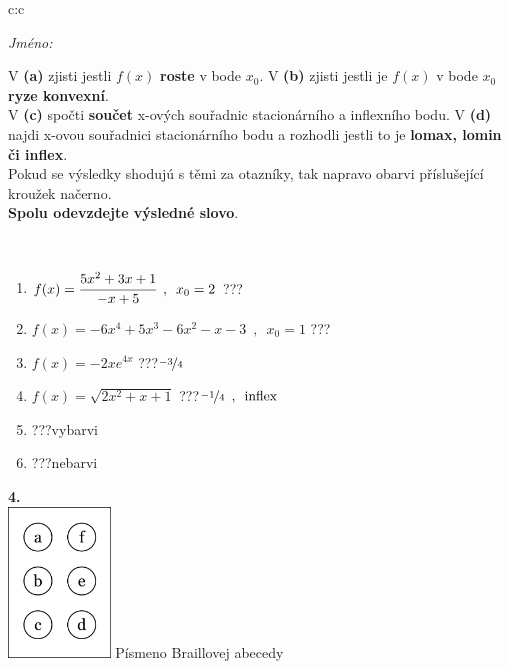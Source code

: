 \documentclass[10pt]{report}
\begin{document}
\begin{tabular}{c:c}
\begin{minipage}[c][104.5mm][t]{0.5\linewidth}
\begin{center}
\textit{Jméno:}\phantom{xxxxxxxxxxxxxxxxxxxxxxxxxxxxxxxxxxxxxxxxxxxxxxxxxxxxxxxxxxxxxxxxx}\\[5mm]
\begin{minipage}{0.95\linewidth}
\begin{center}
{\small V \textbf{(a)} zjisti jestli $f(x)$ \textbf{roste} v bode $x_0$. V \textbf{(b)} zjisti jestli je $f(x)$ v bode $x_0$ \textbf{ryze konvexní}.\\V \textbf{(c)} spočti \textbf{součet} x-ových souřadnic stacionárního a inflexního bodu. V \textbf{(d)} najdi x-ovou souřadnici stacionárního bodu a rozhodli jestli to je \textbf{lomax, lomin či inflex}.\\Pokud se výsledky shodujú s těmi za otazníky, tak napravo obarvi příslušející kroužek načerno.\\\textbf{Spolu odevzdejte výsledné slovo}}.
\end{center}
\end{minipage}
\\[1mm]
\begin{minipage}{0.79\linewidth}
\begin{center}
\begin{varwidth}{\linewidth}
\begin{enumerate}
\normalsize
\item $f(x)=\cfrac{5x^2+3x+1}{-x+5}\enspace , \enspace x_0=2$\quad \dotfill\; ???\;\dotfill \quad {}
\item $f(x)=-6x^4+5x^3-6x^2-x-3\enspace , \enspace x_0=1$\quad \dotfill\; ???\;\dotfill \quad {}
\item $f(x)=-2xe^{4x}$\quad \dotfill\; ???\;\dotfill \quad $\nicefrac{-3}{4}$
\item $f(x)=\sqrt{2x^2+x+1}$\quad \dotfill\; ???\;\dotfill \quad $\nicefrac{-1}{4}\enspace , \enspace\mathrm{inflex}$
\item \quad \dotfill\; ???\;\dotfill \quad vybarvi
\item \quad \dotfill\; ???\;\dotfill \quad nebarvi
\end{enumerate}
\end{varwidth}
\end{center}
\end{minipage}
\begin{minipage}{0.20\linewidth}
\begin{center}
{\Huge\bfseries 4.} \\[2mm]
\includegraphics[height=40mm]{../images/braille.png}
{\small Písmeno Braillovej abecedy}
\end{center}
\end{minipage}
\end{center}
\end{minipage}
%
\end{tabular}
\end{document}
